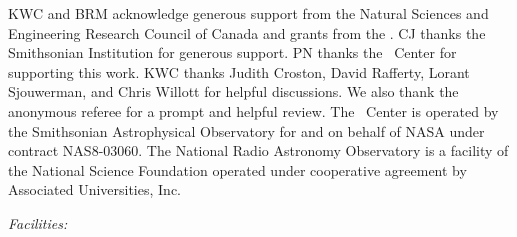 \documentclass{emulateapj}
\begin{document}
\acknowledgements

KWC and BRM acknowledge generous support from the Natural Sciences and
Engineering Research Council of Canada and grants from the \cxo. CJ
thanks the Smithsonian Institution for generous support. PN thanks the
\cxo\ Center for supporting this work. KWC thanks Judith Croston,
David Rafferty, Lorant Sjouwerman, and Chris Willott for helpful
discussions. We also thank the anonymous referee for a prompt and
helpful review. The \cxo\ Center is operated by the Smithsonian
Astrophysical Observatory for and on behalf of NASA under contract
NAS8-03060. The National Radio Astronomy Observatory is a facility of
the National Science Foundation operated under cooperative agreement
by Associated Universities, Inc.


{\it Facilities:}  





\clearpage

\clearpage


\end{document}
